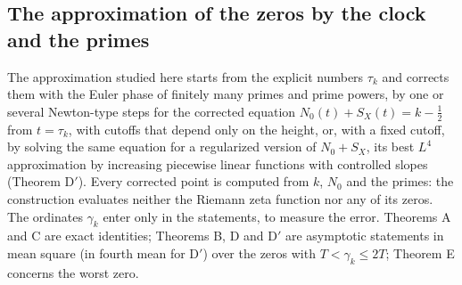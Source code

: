 \documentclass[preprint,12pt]{elsarticle}
\numberwithin{equation}{section}
\theoremstyle{plain}
\theoremstyle{definition}
\theoremstyle{remark}
\newcommand{\NO}{N_0}
\begin{document}
\subsection{The approximation of the zeros by the clock and the primes}
\label{subsec:program}
The approximation studied here starts from the explicit numbers $\tau_k$ and corrects them with the Euler phase of finitely many primes and prime powers, by one or several Newton-type steps for the corrected equation $\NO(t)+S_X(t)=k-\frac12$ from $t=\tau_k$, with cutoffs that depend only on the height, or, with a fixed cutoff, by solving the same equation for a regularized version of $\NO+S_X$, its best $L^4$ approximation by increasing piecewise linear functions with controlled slopes (Theorem D$'$). Every corrected point is computed from $k$, $\NO$ and the primes: the construction evaluates neither the Riemann zeta function nor any of its zeros. The ordinates $\gamma_k$ enter only in the statements, to measure the error. Theorems A and C are exact identities; Theorems B, D and D$'$ are asymptotic statements in mean square (in fourth mean for D$'$) over the zeros with $T<\gamma_k\le2T$; Theorem E concerns the worst zero.
\end{document}
